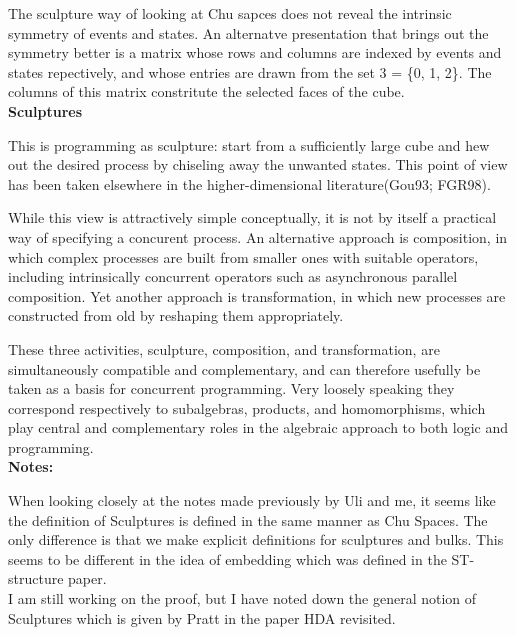 \documentclass[a4paper,11pt]{article}
\begin{document}
    The sculpture way of looking at Chu sapces does not reveal the intrinsic symmetry of events and states. An alternatve presentation that brings out the symmetry better is a matrix whose rows and columns are indexed by events and states repectively, and whose entries are drawn from the set 3 = \{0, 1, 2\}. The columns of this matrix constritute the selected faces of the cube.\\
    
    \noindent \textbf{Sculptures}
    
    \noindent This is programming as sculpture: start from a sufficiently large cube and hew out the desired process by chiseling away the unwanted states. This point of view has been taken elsewhere in the higher-dimensional literature(Gou93; FGR98).
    
    While this view is attractively simple conceptually, it is not by itself a practical way of specifying a concurent process. An alternative approach is composition, in which complex processes are built from smaller ones with suitable operators, including intrinsically concurrent operators such as asynchronous parallel composition. Yet another approach is transformation, in which new processes are constructed from old by reshaping them appropriately.
    
    These three activities, sculpture, composition, and transformation, are simultaneously compatible and complementary, and can therefore usefully be taken as a basis for concurrent programming. Very loosely speaking they correspond respectively to subalgebras, products, and homomorphisms, which play central and complementary roles in the algebraic approach to both logic and programming.\\
    
    \noindent \textbf{Notes:}
    
    \noindent When looking closely at the notes made previously by Uli and me, it seems like the definition of Sculptures is defined in the same manner as Chu Spaces. The only difference is that we make explicit definitions for sculptures and bulks. This seems to be different in the idea of embedding which was defined in the ST-structure paper.\\
    
    \noindent I am still working on the proof, but I have noted down the general notion of Sculptures which is given by Pratt in the paper HDA revisited.
    
\end{document}
